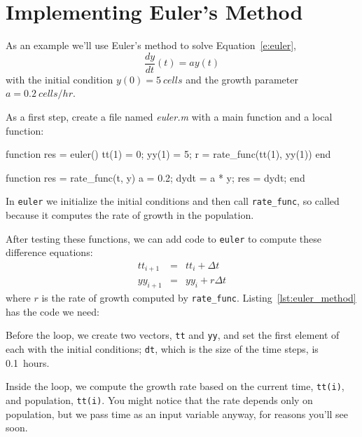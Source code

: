 \documentclass[../../book.tex]{subfiles}
\begin{document}


\section{Implementing Euler's Method}

As an example we'll use Euler's method to solve Equation~\ref{e:euler},
\[ \frac{dy}{dt}(t) = a y(t) \]
with the initial condition $y(0) = \SI{5}{cells}$  and
the growth parameter $a = \SI{0.2}{cells/hr}$.


As a first step, create a file named \emph{euler.m} with a main function and a local function:

\begin{code}
function res = euler()
    tt(1) = 0;
    yy(1) = 5;
    r = rate_func(tt(1), yy(1))
end

function res = rate_func(t, y)
   a = 0.2;
   dydt = a * y;
   res = dydt;
end
\end{code}

In \lstinline{euler} we initialize the initial conditions and then call \lstinline{rate_func}, so called because it computes the rate of growth in the population.


After testing these functions, we can add code to \lstinline{euler} to compute these difference equations:
\begin{eqnarray*}
tt_{i+1} &=&tt_i + \Delta t             \\
yy_{i+1} &=& yy_i + r \Delta t
\end{eqnarray*}
%
where $r$ is the rate of growth computed by \lstinline{rate_func}.
Listing~\ref{lst:euler_method} has the code we need:



Before the loop, we create two vectors, \lstinline{tt} and \lstinline{yy}, and set the first element of each with the initial conditions;  \lstinline{dt}, which is the size of the time steps, is \SI{0.1}{hours}.

Inside the loop, we compute the growth rate based on the current time, \lstinline{tt(i)}, and population, \lstinline{tt(i)}.  You might notice that the rate depends only on population, but we pass time as an input variable anyway, for reasons you'll see soon.
\end{document}
